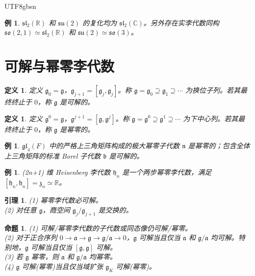 \documentclass[11pt]{article}
\newtheorem{lemma}[theorem]{引理}
\newtheorem{proposition}[theorem]{命题}
\newtheorem{definition}[theorem]{定义}
\newtheorem{example}[theorem]{例}
\begin{document}
\begin{CJK*}{UTF8}{gbsn}
\begin{example}
$\mathfrak{sl}_2(\mathbb{R})$ 和 $\mathfrak{su}(2)$ 的复化均为 $\mathfrak{sl}_2(\mathbb{C})$。另外存在实李代数同构 $\mathfrak{so}(2,1) \simeq \mathfrak{sl}_2(\mathbb{R})$ 和 $\mathfrak{su}(2) \simeq \mathfrak{so}(3)$。
\end{example}

\section{可解与幂零李代数}

\begin{definition}
定义 $\mathfrak{g}_0 = \mathfrak{g}$，$\mathfrak{g}_{j+1} = [\mathfrak{g}_j, \mathfrak{g}_j]$。称 $\mathfrak{g} = \mathfrak{g}_0 \supseteq \mathfrak{g}_1 \supseteq \cdots$ 为换位子列。若其最终终止于 $0$，称 $\mathfrak{g}$ 是可解的。
\end{definition}

\begin{definition}
定义 $\mathfrak{g}^0 = \mathfrak{g}$，$\mathfrak{g}^{j+1} = [\mathfrak{g}, \mathfrak{g}^j]$。称 $\mathfrak{g} = \mathfrak{g}^0 \supseteq \mathfrak{g}^1 \supseteq \cdots$ 为下中心列。若其最终终止于 $0$，称 $\mathfrak{g}$ 是幂零的。
\end{definition}

\begin{example}
$\mathfrak{gl}_4(F)$ 中的严格上三角矩阵构成的极大幂零子代数 $\mathfrak{n}$ 是幂零的；包含全体上三角矩阵的标准 Borel 子代数 $\mathfrak{b}$ 是可解的。
\end{example}

\begin{example}
(2n+1) 维 Heisenberg 李代数 $\mathfrak{h}_n$ 是一个两步幂零李代数，满足 $[\mathfrak{h}_n, \mathfrak{h}_n] = \mathfrak{z}_n \simeq \mathbb{R}$。
\end{example}

\begin{lemma}
(1) 幂零李代数必可解。\\
(2) 对任意 $\mathfrak{g}$，商空间 $\mathfrak{g}_j/\mathfrak{g}_{j+1}$ 是交换的。
\end{lemma}

\begin{proposition}
(1) 可解/幂零李代数的子代数或同态像仍可解/幂零。\\
(2) 对于正合序列 $0 \to \mathfrak{a} \to \mathfrak{g} \to \mathfrak{g}/\mathfrak{a} \to 0$，$\mathfrak{g}$ 可解当且仅当 $\mathfrak{a}$ 和 $\mathfrak{g}/\mathfrak{a}$ 均可解。特别地，$\mathfrak{g}$ 可解当且仅当 $[\mathfrak{g},\mathfrak{g}]$ 可解。\\
(3) 若 $\mathfrak{g}$ 幂零，则 $\mathfrak{a}$ 和 $\mathfrak{g}/\mathfrak{a}$ 均幂零。\\
(4) $\mathfrak{g}$ 可解(幂零)当且仅当域扩张 $\mathfrak{g}_K$ 可解(幂零)。
\end{proposition}


\end{CJK*}
\end{document}
